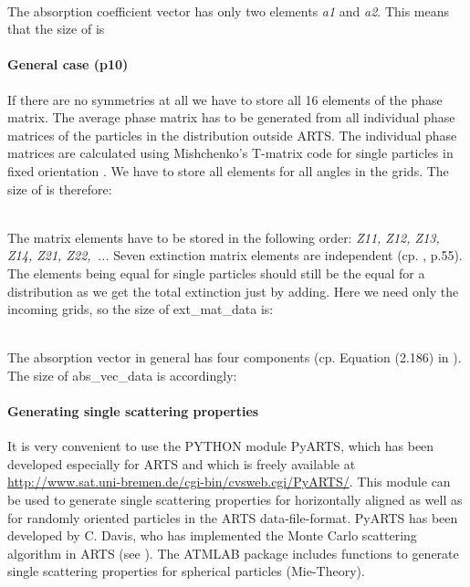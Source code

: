 \artsstyle{[N\_f N\_T N\_za/2+1 1 3]}\\
The absorption coefficient vector has only two elements {\sl a1} and
{\sl a2}. This means that the size of  is 

\artsstyle{[N\_f N\_T N\_za/2+1 1 2]}

\paragraph{General case (p10)}

If there are no symmetries at all we have to store all 16 elements of
the phase matrix. The average phase matrix has to be generated from
all individual phase matrices of the particles in the distribution
outside ARTS. The individual phase matrices are calculated using
Mishchenko's T-matrix code for single particles in fixed orientation
\citep{Mishchenko:00}. 
We have to store all elements for all angles in the grids. The size of
 is therefore: 

\\
The matrix elements have to be stored in the following order: {\sl Z11,
  Z12, Z13, Z14, Z21, Z22,~...} Seven extinction matrix elements are
independent (cp. \citet{Mishchenko:02}, p.55). The elements being equal for
single particles should still be the equal for a distribution as we
get the total extinction just by adding. Here we need only the
incoming grids, so the size of ext\_mat\_data is: 

\\
The absorption vector in general has four components (cp. Equation
(2.186) in \citet{Mishchenko:02}). The size of abs\_vec\_data is
accordingly: 


\paragraph{Generating single scattering properties}
It is very convenient to use the PYTHON module PyARTS, which has been
developed especially for ARTS and which is freely available at
\href{http://www.sat.uni-bremen.de/cgi-bin/cvsweb.cgi/PyARTS/}
{\url{http://www.sat.uni-bremen.de/cgi-bin/cvsweb.cgi/PyARTS/}}. This
module can be used to generate single scattering properties for
horizontally aligned as well as for randomly oriented particles in the
ARTS data-file-format. PyARTS has been developed by C. Davis, who has
implemented the Monte Carlo scattering algorithm in ARTS (see
).
The ATMLAB package includes functions to generate single scattering
properties for spherical particles (Mie-Theory). 


